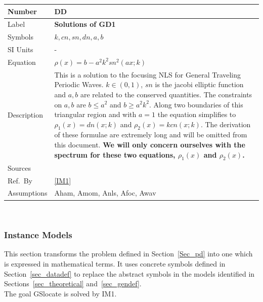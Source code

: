 \documentclass[12pt]{article}
\newcommand{\colAwidth}{0.13\textwidth}
\newcommand{\colBwidth}{0.82\textwidth}
\newcounter{defnum} %
\newcounter{datadefnum} %
\begin{document}
\noindent
\begin{minipage}{\textwidth} \label{DD2}
	\renewcommand*{\arraystretch}{1.5}
	\begin{tabular}{| p{\colAwidth} | p{\colBwidth}|}
		\hline
		\rowcolor[gray]{0.9}
		Number& DD{datadefnum}\thedatadefnum \label{FluxCoil}\\
		\hline
		Label& \bf Solutions of GD1\\
		\hline
		Symbols &$k, cn, sn, dn,a,b$\\
		\hline
		SI Units & -\\
		\hline
		Equation &$ \rho(x) = b - a^{2}k^{2}sn^{2}(ax;k)$\\
		\hline
		Description & 
		This is a solution to the focusing NLS for 
		General Traveling Periodic Waves. $k\in (0,1)$, $sn$ is the jacobi 
		elliptic function and $a,b$ are related to the conserved quantities. 
		The constraints on $a,b$ are $b \leq a^{2}$ and $b \geq a^{2}k^{2}$. 
		Along two boundaries of this triangular region and with $a=1$ the 
		equation simplifies to $ \rho_{1}(x) = dn(x;k) $ and $ \rho_{2}(x) = 
		kcn(x;k)$.
		The derivation of these formulae are extremely long and will be omitted 
		from this document.  \textbf{We will only concern ourselves with the 
		spectrum for these two equations, $ \rho_{1}(x)$ and $\rho_{2}(x)$.} 
		\\
		\hline
		Sources& \cite{SegaletAl} \\
		\hline
		Ref.\ By & \ref{IM1}\\
		\hline 
		Assumptions & Aham, Amom, Anls, Afoc, Awav \\
		\hline 
	\end{tabular}\\
\end{minipage} 

\subsubsection{Instance Models} \label{sec_instance}    

This section transforms the problem defined in Section~\ref{Sec_pd} into 
one which is expressed in mathematical terms. It uses concrete symbols defined 
in Section~\ref{sec_datadef} to replace the abstract symbols in the models 
identified in Sections~\ref{sec_theoretical} and~\ref{sec_gendef}. \\

The goal GSlocate is solved by IM1.  
\end{document}
